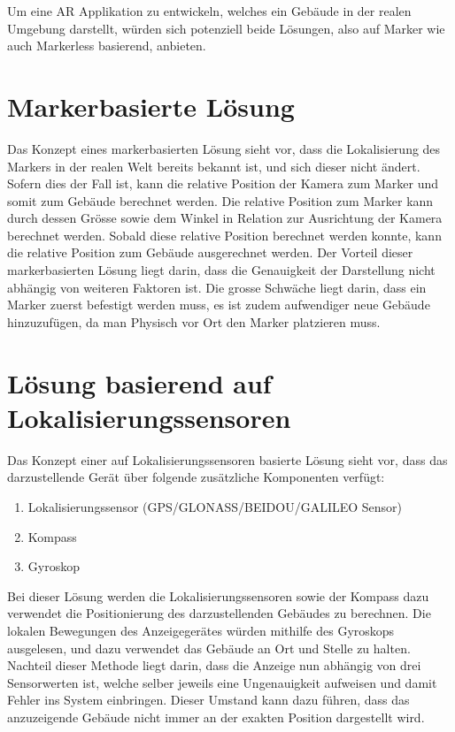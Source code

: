 \documentclass[a4paper]{scrreprt}
\begin{document}
Um eine AR Applikation zu entwickeln, welches ein Gebäude in der realen Umgebung darstellt, würden sich potenziell beide Lösungen, also auf Marker wie auch Markerless basierend, anbieten.

\section{Markerbasierte Lösung}
Das Konzept eines markerbasierten Lösung sieht vor, dass die Lokalisierung des Markers in der realen Welt bereits bekannt ist, und sich dieser nicht ändert. Sofern dies der Fall ist, kann die relative Position der Kamera zum Marker und somit zum Gebäude berechnet werden.
Die relative Position zum Marker kann durch dessen Grösse sowie dem Winkel in Relation zur Ausrichtung der Kamera berechnet werden. Sobald diese relative Position berechnet werden konnte, kann die relative Position zum Gebäude ausgerechnet werden.
Der Vorteil dieser markerbasierten Lösung liegt darin, dass die Genauigkeit der Darstellung nicht abhängig von weiteren Faktoren ist. Die grosse Schwäche liegt darin, dass ein Marker zuerst befestigt werden muss, es ist zudem aufwendiger neue Gebäude hinzuzufügen, da man Physisch vor Ort den Marker platzieren muss.


\section{Lösung basierend auf Lokalisierungssensoren}
Das Konzept einer auf Lokalisierungssensoren basierte Lösung sieht vor, dass das darzustellende Gerät über folgende zusätzliche Komponenten verfügt: 
\begin{enumerate}
	\item Lokalisierungssensor (GPS/GLONASS/BEIDOU/GALILEO Sensor)
	\item Kompass
	\item Gyroskop
\end{enumerate}
Bei dieser Lösung werden die Lokalisierungssensoren sowie der Kompass dazu verwendet die Positionierung des darzustellenden Gebäudes zu berechnen. Die lokalen Bewegungen des Anzeigegerätes würden mithilfe des Gyroskops ausgelesen, und dazu verwendet das Gebäude an Ort und Stelle zu halten.
Nachteil dieser Methode liegt darin, dass die Anzeige nun abhängig von drei Sensorwerten ist, welche selber jeweils eine Ungenauigkeit aufweisen und damit Fehler ins System einbringen. Dieser Umstand kann dazu führen, dass das anzuzeigende Gebäude nicht immer an der exakten Position dargestellt wird.
\end{document}
